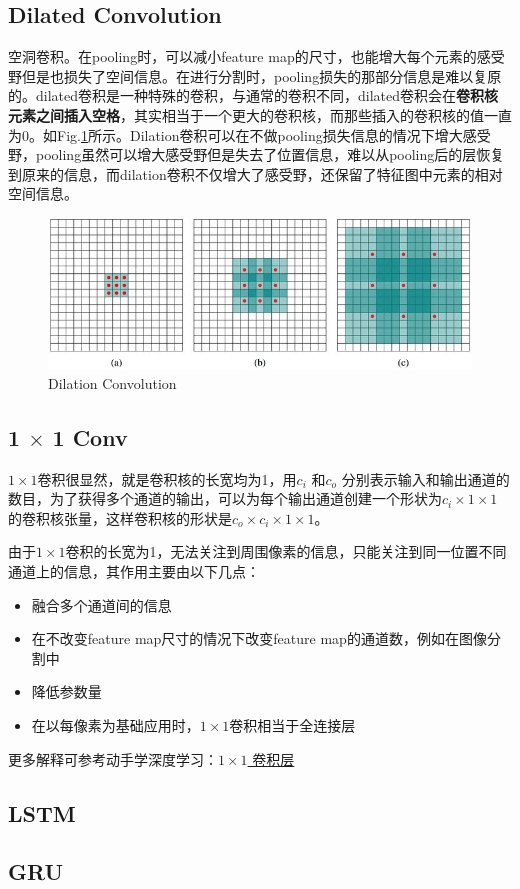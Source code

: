 \subsection{Dilated Convolution}空洞卷积。在pooling时，可以减小feature map的尺寸，也能增大每个元素的感受野但是也损失了空间信息。在进行分割时，pooling损失的那部分信息是难以复原的。dilated卷积是一种特殊的卷积，与通常的卷积不同，dilated卷积会在\textbf{卷积核元素之间插入空格}，其实相当于一个更大的卷积核，而那些插入的卷积核的值一直为0。如Fig.\ref{fig:dilation}所示。Dilation卷积可以在不做pooling损失信息的情况下增大感受野，pooling虽然可以增大感受野但是失去了位置信息，难以从pooling后的层恢复到原来的信息，而dilation卷积不仅增大了感受野，还保留了特征图中元素的相对空间信息。
\begin{figure}[h]
	\centering
	\includegraphics[width=.8\textwidth]{pics/dilation.jpg}
	\caption{Dilation Convolution}
	\label{fig:dilation}
\end{figure}

\subsection{1 $\times$ 1 Conv}
$1\times 1$卷积很显然，就是卷积核的长宽均为1，用$c_i$ 和$c_o$  分别表示输入和输出通道的数目，为了获得多个通道的输出，可以为每个输出通道创建一个形状为$c_i\times 1 \times 1$ 的卷积核张量，这样卷积核的形状是$c_o \times c_i \times 1 \times 1$。

由于$1\times 1$卷积的长宽为1，无法关注到周围像素的信息，只能关注到同一位置不同通道上的信息，其作用主要由以下几点：
\begin{itemize}
	\item 融合多个通道间的信息
	\item 在不改变feature map尺寸的情况下改变feature map的通道数，例如在图像分割中
	\item 降低参数量
	\item 在以每像素为基础应用时，$1\times 1$卷积相当于全连接层
\end{itemize}
更多解释可参考动手学深度学习：\href{https://zh-v2.d2l.ai/chapter_convolutional-neural-networks/channels.html#times-1}{$1\times 1$  卷积层}

\subsection{LSTM}

\subsection{GRU}
